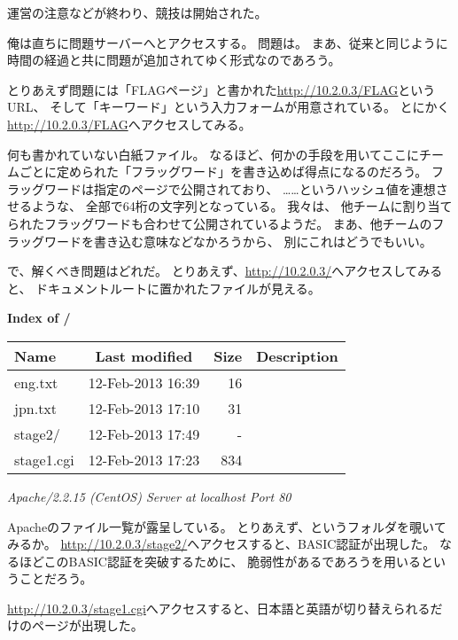運営の注意などが終わり、競技は開始された。

俺は直ちに問題サーバーへとアクセスする。
問題は。
まあ、従来と同じように時間の経過と共に問題が追加されてゆく形式なのであろう。

とりあえず問題には「FLAGページ」と書かれた\url{http://10.2.0.3/FLAG}というURL、
そして「キーワード」という入力フォームが用意されている。
とにかく\url{http://10.2.0.3/FLAG}へアクセスしてみる。

何も書かれていない白紙ファイル。
なるほど、何かの手段を用いてここにチームごとに定められた「フラッグワード」を書き込めば得点になるのだろう。
フラッグワードは指定のページで公開されており、
……というハッシュ値を連想させるような、
全部で64桁の文字列となっている。
我々は、
他チームに割り当てられたフラッグワードも合わせて公開されているようだ。
まあ、他チームのフラッグワードを書き込む意味などなかろうから、
別にこれはどうでもいい。

で、解くべき問題はどれだ。
とりあえず、\url{http://10.2.0.3/}へアクセスしてみると、
ドキュメントルートに置かれたファイルが見える。

\begin{itembox}[c]{\textbf{Index of /}}
\small
\begin{table}[H]
	\footnotesize
	\begin{tabular}{lcrl}
		\hfill Name & Last modified & Size & Description \\
		\hline
		eng.txt & 12-Feb-2013 16:39 & 16 \\
		jpn.txt & 12-Feb-2013 17:10 & 31 \\
		stage2/ & 12-Feb-2013 17:49 & -  \\
		stage1.cgi & 12-Feb-2013 17:23 & 834 \\
		\hline
	\end{tabular}
\end{table}
\textit{Apache/2.2.15 (CentOS) Server at localhost Port 80}
\end{itembox}

Apacheのファイル一覧が露呈している。
とりあえず、というフォルダを覗いてみるか。
\url{http://10.2.0.3/stage2/}へアクセスすると、BASIC認証が出現した。
なるほどこのBASIC認証を突破するために、
脆弱性があるであろうを用いるということだろう。

\url{http://10.2.0.3/stage1.cgi}へアクセスすると、日本語と英語が切り替えられるだけのページが出現した。



